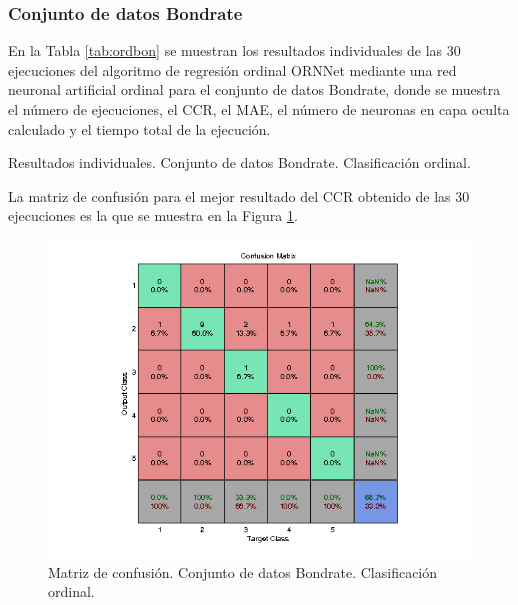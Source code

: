 			\subsubsection{Conjunto de datos Bondrate}
			
			En la Tabla \ref{tab:ordbon} se muestran los resultados individuales de las 30 ejecuciones del algoritmo de regresión ordinal ORNNet mediante una red neuronal artificial ordinal para el conjunto de datos Bondrate, donde se muestra el número de ejecuciones, el CCR, el MAE, el número de neuronas en capa oculta calculado y el tiempo total de la ejecución.\\
			
			\begin{table}[!htbp]
				\centering
				\caption{Resultados individuales. Conjunto de datos Bondrate. Clasificación ordinal.}
				\label{tab:ordbon}
			\end{table}
			
			La matriz de confusión para el mejor resultado del CCR obtenido de las 30 ejecuciones es la que se muestra en la Figura \ref{fig:ordbon}.
			
			\begin{figure}[htbp]
				\centering
				\includegraphics[scale=0.8]{../src/results/ordinal/bondrate_mc1.png}
				\caption{Matriz de confusión. Conjunto de datos Bondrate. Clasificación ordinal.}
				\label{fig:ordbon}
			\end{figure}
			

